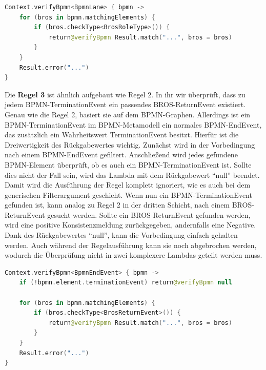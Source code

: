 \begin{lstlisting}[language=Kotlin, caption=Implementierung von Regel 2, label=lst:implementation_rule_2]
Context.verifyBpmn<BpmnLane> { bpmn ->
    for (bros in bpmn.matchingElements) {
        if (bros.checkType<BrosRoleType>()) {
            return@verifyBpmn Result.match("...", bros = bros)
        }
    }
    Result.error("...")
}
\end{lstlisting}

Die \textbf{Regel 3} ist ähnlich aufgebaut wie Regel 2.
In ihr wir überprüft, dass zu jedem BPMN-TerminationEvent ein passendes BROS-ReturnEvent existiert.
Genau wie die Regel 2, basiert sie auf dem BPMN-Graphen.
Allerdings ist ein BPMN-TerminationEvent im BPMN-Metamodell ein normales BPMN-EndEvent, das zusätzlich ein Wahrheitswert TerminationEvent besitzt.
Hierfür ist die Dreiwertigkeit des Rückgabewertes wichtig.
Zunächst wird in der Vorbedingung nach einem BPMN-EndEvent gefiltert.
Anschließend wird jedes gefundene BPMN-Element überprüft, ob es auch ein BPMN-TerminationEvent ist.
Sollte dies nicht der Fall sein, wird das Lambda mit dem Rückgabewert ``null'' beendet.
Damit wird die Ausführung der Regel komplett ignoriert, wie es auch bei dem generischen Filterargument geschieht.
Wenn nun ein BPMN-TerminationEvent gefunden ist, kann analog zu Regel 2 in der dritten Schicht, nach einem BROS-ReturnEvent gesucht werden.
Sollte ein BROS-ReturnEvent gefunden werden, wird eine positive Konsistenzmeldung zurückgegeben, andernfalls eine Negative.
Dank des Rückgabewertes ``null'', kann die Vorbedingung einfach gehalten werden.
Auch während der Regelausführung kann sie noch abgebrochen werden, wodurch die Überprüfung nicht in zwei komplexere Lambdas geteilt werden muss.

\begin{lstlisting}[language=Kotlin, caption=Implementierung von Regel 3, label=lst:implementation_rule_3]
Context.verifyBpmn<BpmnEndEvent> { bpmn ->
    if (!bpmn.element.terminationEvent) return@verifyBpmn null

    for (bros in bpmn.matchingElements) {
        if (bros.checkType<BrosReturnEvent>()) {
            return@verifyBpmn Result.match("...", bros = bros)
        }
    }
    Result.error("...")
}
\end{lstlisting}

